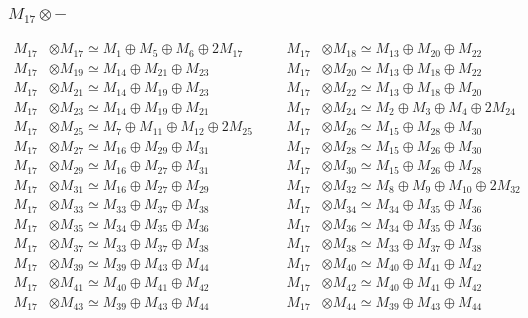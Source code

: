 \subsubsection{$ M_{17}\otimes -$}
\begin{align*}
M_{17} &\otimes M_{17} \simeq M_{1} \oplus M_{5} \oplus M_{6} \oplus 2M_{17} &&& M_{17} &\otimes M_{18} \simeq M_{13} \oplus M_{20} \oplus M_{22}\\
M_{17} &\otimes M_{19} \simeq M_{14} \oplus M_{21} \oplus M_{23} &&& M_{17} &\otimes M_{20} \simeq M_{13} \oplus M_{18} \oplus M_{22}\\
M_{17} &\otimes M_{21} \simeq M_{14} \oplus M_{19} \oplus M_{23} &&& M_{17} &\otimes M_{22} \simeq M_{13} \oplus M_{18} \oplus M_{20}\\
M_{17} &\otimes M_{23} \simeq M_{14} \oplus M_{19} \oplus M_{21} &&& M_{17} &\otimes M_{24} \simeq M_{2} \oplus M_{3} \oplus M_{4} \oplus 2M_{24}\\
M_{17} &\otimes M_{25} \simeq M_{7} \oplus M_{11} \oplus M_{12} \oplus 2M_{25} &&& M_{17} &\otimes M_{26} \simeq M_{15} \oplus M_{28} \oplus M_{30}\\
M_{17} &\otimes M_{27} \simeq M_{16} \oplus M_{29} \oplus M_{31} &&& M_{17} &\otimes M_{28} \simeq M_{15} \oplus M_{26} \oplus M_{30}\\
M_{17} &\otimes M_{29} \simeq M_{16} \oplus M_{27} \oplus M_{31} &&& M_{17} &\otimes M_{30} \simeq M_{15} \oplus M_{26} \oplus M_{28}\\
M_{17} &\otimes M_{31} \simeq M_{16} \oplus M_{27} \oplus M_{29} &&& M_{17} &\otimes M_{32} \simeq M_{8} \oplus M_{9} \oplus M_{10} \oplus 2M_{32}\\
M_{17} &\otimes M_{33} \simeq M_{33} \oplus M_{37} \oplus M_{38} &&& M_{17} &\otimes M_{34} \simeq M_{34} \oplus M_{35} \oplus M_{36}\\
M_{17} &\otimes M_{35} \simeq M_{34} \oplus M_{35} \oplus M_{36} &&& M_{17} &\otimes M_{36} \simeq M_{34} \oplus M_{35} \oplus M_{36}\\
M_{17} &\otimes M_{37} \simeq M_{33} \oplus M_{37} \oplus M_{38} &&& M_{17} &\otimes M_{38} \simeq M_{33} \oplus M_{37} \oplus M_{38}\\
M_{17} &\otimes M_{39} \simeq M_{39} \oplus M_{43} \oplus M_{44} &&& M_{17} &\otimes M_{40} \simeq M_{40} \oplus M_{41} \oplus M_{42}\\
M_{17} &\otimes M_{41} \simeq M_{40} \oplus M_{41} \oplus M_{42} &&& M_{17} &\otimes M_{42} \simeq M_{40} \oplus M_{41} \oplus M_{42}\\
M_{17} &\otimes M_{43} \simeq M_{39} \oplus M_{43} \oplus M_{44} &&& M_{17} &\otimes M_{44} \simeq M_{39} \oplus M_{43} \oplus M_{44}\\

\end{align*}
